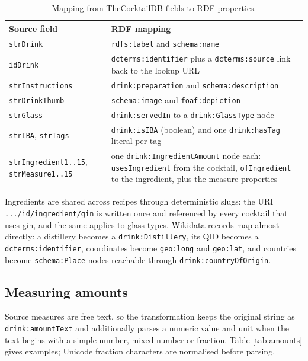 \begin{table}[h]
  \centering
  \small
  \begin{tabular}{@{}lp{9.6cm}@{}}
    \toprule
    Source field & RDF mapping \\
    \midrule
    \texttt{strDrink} & \texttt{rdfs:label} and \texttt{schema:name} \\
    \texttt{idDrink} & \texttt{dcterms:identifier} plus a \texttt{dcterms:source} link back to the lookup URL \\
    \texttt{strInstructions} & \texttt{drink:preparation} and \texttt{schema:description} \\
    \texttt{strDrinkThumb} & \texttt{schema:image} and \texttt{foaf:depiction} \\
    \texttt{strGlass} & \texttt{drink:servedIn} to a \texttt{drink:GlassType} node \\
    \texttt{strIBA}, \texttt{strTags} & \texttt{drink:isIBA} (boolean) and one \texttt{drink:hasTag} literal per tag \\
    \texttt{strIngredient1..15}, \texttt{strMeasure1..15} & one \texttt{drink:IngredientAmount} node each: \texttt{usesIngredient} from the cocktail, \texttt{ofIngredient} to the ingredient, plus the measure properties \\
    \bottomrule
  \end{tabular}
  \caption{Mapping from TheCocktailDB fields to RDF properties.}
  \label{tab:mapping}
\end{table}

Ingredients are shared across recipes through deterministic slugs: the URI
\texttt{.../id/ingredient/gin} is written once and referenced by every
cocktail that uses gin, and the same applies to glass types. Wikidata records
map almost directly: a distillery becomes a \texttt{drink:Distillery}, its QID
becomes a \texttt{dcterms:identifier}, coordinates become \texttt{geo:long} and
\texttt{geo:lat}, and countries become \texttt{schema:Place} nodes reachable
through \texttt{drink:countryOfOrigin}.

\subsection{Measuring amounts}

Source measures are free text, so the transformation keeps the original string
as \texttt{drink:amountText} and additionally parses a numeric value and unit
when the text begins with a simple number, mixed number or fraction. Table
\ref{tab:amounts} gives examples; Unicode fraction characters are normalised
before parsing.

